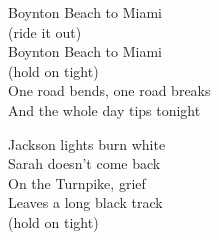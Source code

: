 \begin{lyrics}
Boynton Beach to Miami\\
(ride it out)\\
Boynton Beach to Miami\\
(hold on tight)\\
One road bends, one road breaks\\
And the whole day tips tonight

Jackson lights burn white\\
Sarah doesn’t come back\\
On the Turnpike, grief\\
Leaves a long black track\\
(hold on tight)

\end{lyrics}

